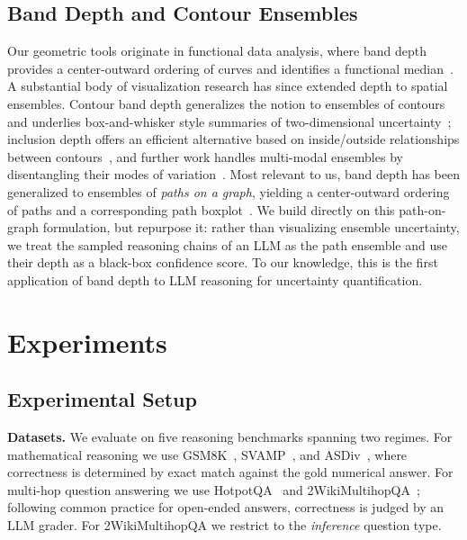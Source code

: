 \documentclass[11pt]{article}
\begin{document}
\subsection{Band Depth and Contour Ensembles}
Our geometric tools originate in functional data analysis, where band depth
provides a center-outward ordering of curves and identifies a functional
median~\citep{lopezpintado2009banddepth}. A substantial body of visualization
research has since extended depth to spatial ensembles. Contour band depth
generalizes the notion to ensembles of contours and underlies box-and-whisker
style summaries of two-dimensional uncertainty~\citep{santer2023contourbanddepth};
inclusion depth offers an efficient alternative based on inside/outside
relationships between contours~\citep{chavesdeplaza2024inclusiondepth}, and
further work handles multi-modal ensembles by disentangling their modes of
variation~\citep{chavesdeplaza2024multimodal}. Most relevant to us, band depth has
been generalized to ensembles of \emph{paths on a graph}, yielding a
center-outward ordering of paths and a corresponding path
boxplot~\citep{raj2017pathboxplots}. We build directly on this path-on-graph
formulation, but repurpose it: rather than visualizing ensemble uncertainty, we
treat the sampled reasoning chains of an LLM as the path ensemble and use their
depth as a black-box confidence score. To our knowledge, this is the first
application of band depth to LLM reasoning for uncertainty quantification.

\section{Experiments}
\label{sec:exp}

\subsection{Experimental Setup}
\label{sec:exp:setup}

\textbf{Datasets.} We evaluate on five reasoning benchmarks spanning two regimes.
For mathematical reasoning we use GSM8K~\citep{cobbe2021gsm8k},
SVAMP~\citep{patel2021svamp}, and ASDiv~\citep{miao2020asdiv}, where correctness
is determined by exact match against the gold numerical answer. For multi-hop
question answering we use HotpotQA~\citep{yang2018hotpotqa} and
2WikiMultihopQA~\citep{ho2020wikimultihop}; following common practice for
open-ended answers, correctness is judged by an LLM grader. For 2WikiMultihopQA
we restrict to the \emph{inference} question type.
\end{document}

